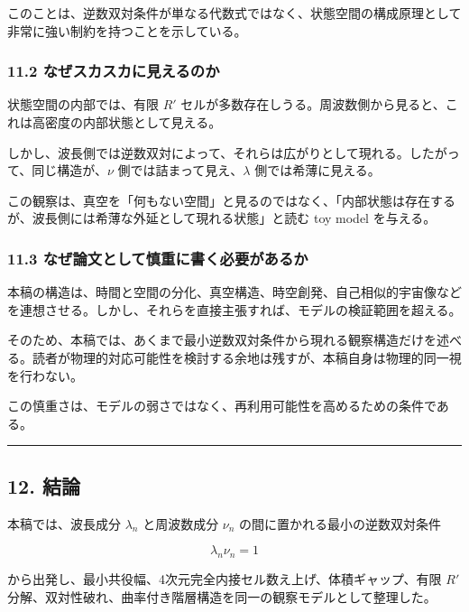 \documentclass[
]{ltjsarticle}
\begin{document}
このことは、逆数双対条件が単なる代数式ではなく、状態空間の構成原理として非常に強い制約を持つことを示している。

\subsubsection{11.2
なぜスカスカに見えるのか}\label{ux306aux305cux30b9ux30abux30b9ux30abux306bux898bux3048ux308bux306eux304b}

状態空間の内部では、有限 \(R'\)
セルが多数存在しうる。周波数側から見ると、これは高密度の内部状態として見える。

しかし、波長側では逆数双対によって、それらは広がりとして現れる。したがって、同じ構造が、\(\nu\)
側では詰まって見え、\(\lambda\) 側では希薄に見える。

この観察は、真空を「何もない空間」と見るのではなく、「内部状態は存在するが、波長側には希薄な外延として現れる状態」と読む
toy model を与える。

\subsubsection{11.3
なぜ論文として慎重に書く必要があるか}\label{ux306aux305cux8ad6ux6587ux3068ux3057ux3066ux614eux91cdux306bux66f8ux304fux5fc5ux8981ux304cux3042ux308bux304b}

本稿の構造は、時間と空間の分化、真空構造、時空創発、自己相似的宇宙像などを連想させる。しかし、それらを直接主張すれば、モデルの検証範囲を超える。

そのため、本稿では、あくまで最小逆数双対条件から現れる観察構造だけを述べる。読者が物理的対応可能性を検討する余地は残すが、本稿自身は物理的同一視を行わない。

この慎重さは、モデルの弱さではなく、再利用可能性を高めるための条件である。

\begin{center}\rule{0.5\linewidth}{0.5pt}\end{center}

\subsection{12. 結論}\label{ux7d50ux8ad6}

本稿では、波長成分 \(\lambda_n\) と周波数成分 \(\nu_n\)
の間に置かれる最小の逆数双対条件

\[
\lambda_n\nu_n=1
\]

から出発し、最小共役幅、4次元完全内接セル数え上げ、体積ギャップ、有限
\(R'\)
分解、双対性破れ、曲率付き階層構造を同一の観察モデルとして整理した。
\end{document}
